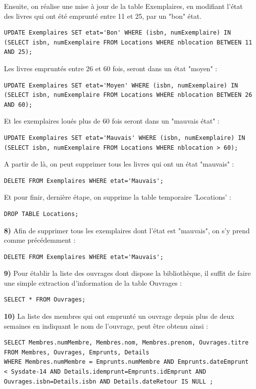\documentclass[a4paper,12pt]{article}
\begin{document}
Ensuite, on réalise une mise à jour de la table Exemplaires, en modifiant l'état des livres qui ont été emprunté entre 11 et 25, par un "bon" état. 
\begin{lstlisting}
UPDATE Exemplaires SET etat='Bon' WHERE (isbn, numExemplaire) IN (SELECT isbn, numExemplaire FROM Locations WHERE nblocation BETWEEN 11 AND 25);
\end{lstlisting}

Les livres empruntés entre 26 et 60 fois, seront dans un état "moyen" : 
\begin{lstlisting}
UPDATE Exemplaires SET etat='Moyen' WHERE (isbn, numExemplaire) IN (SELECT isbn, numExemplaire FROM Locations WHERE nblocation BETWEEN 26 AND 60);
\end{lstlisting}

Et les exemplaires loués plus de 60 fois seront dans un "mauvais état" : 
\begin{lstlisting}
UPDATE Exemplaires SET etat='Mauvais' WHERE (isbn, numExemplaire) IN (SELECT isbn, numExemplaire FROM Locations WHERE nblocation > 60);
\end{lstlisting}

A partir de là, on peut supprimer tous les livres qui ont un état "mauvais" : 
\begin{lstlisting}
DELETE FROM Exemplaires WHERE etat='Mauvais';
\end{lstlisting}

Et pour finir, dernière étape, on supprime la table temporaire 'Locations' : 
\begin{lstlisting}
DROP TABLE Locations;
\end{lstlisting}

  \textbf {8)} Afin de supprimer tous les exemplaires dont l'état est "mauvais", on s'y prend comme précédemment : 
\begin{lstlisting}
DELETE FROM Exemplaires WHERE etat='Mauvais';
\end{lstlisting}

  \textbf {9)} Pour établir la liste des ouvrages dont dispose la bibliothèque, il suffit de faire une simple extraction d'information de la table Ouvrages : 
\begin{lstlisting}
SELECT * FROM Ouvrages;
\end{lstlisting}

  \textbf {10)} La liste des membres qui ont emprunté un ouvrage depuis plus de deux semaines en indiquant le nom de l’ouvrage, peut être obtenu ainsi : 
  \begin{lstlisting}
SELECT Membres.numMembre, Membres.nom, Membres.prenom, Ouvrages.titre 
FROM Membres, Ouvrages, Emprunts, Details 
WHERE Membres.numMembre = Emprunts.numMembre AND Emprunts.dateEmprunt < Sysdate-14 AND Details.idemprunt=Emprunts.idEmprunt AND Ouvrages.isbn=Details.isbn AND Details.dateRetour IS NULL ;
   \end{lstlisting}
\end{document}
